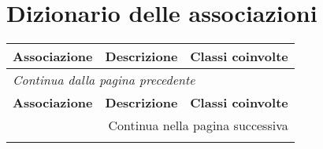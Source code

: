 \section{Dizionario delle associazioni}
\begin{longtable}{|p{}|p{}|p{}|}
	\hline
	\textbf{Associazione} & \textbf{Descrizione} & \textbf{Classi coinvolte}\\
	\hline
	\endfirsthead
	
	\multicolumn{3}{l}{\footnotesize\itshape Continua dalla pagina precedente}\\
	\hline
	\textbf{Associazione} & \textbf{Descrizione} & \textbf{Classi coinvolte}\\
	\hline
	\endhead
	\hline 
	\multicolumn{3}{r}{{Continua nella pagina successiva}} \\
	\endfoot
	

\end{longtable}
